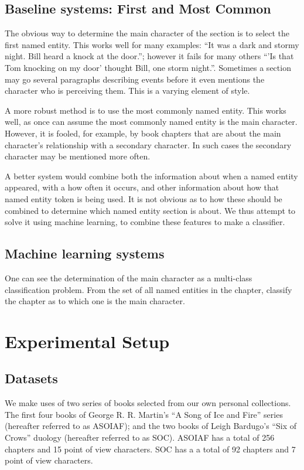 \documentclass[11pt,a4paper]{article}
\begin{document}
\subsection{Baseline systems: First and Most Common}
The obvious way to determine the main character of the section is to select the first named entity. This works well for many examples: ``It was a dark and stormy night. Bill heard a knock at the door.''; however it fails for many others ``'Is that Tom knocking on my door' thought Bill, one storm night.''.
Sometimes a section  may go several paragraphs describing events before it even mentions the character who is perceiving them.
This is a varying element of style.

A more robust method is to use the most commonly named entity.
This works well, as once can assume the most commonly named entity is the main character.
However, it is fooled, for example, by book chapters that are about the main character's relationship with a secondary character.
In such cases the secondary character may be mentioned more often.

A better system would combine both the information about when a named entity appeared,
with a how often it occurs, and other information about how that named entity token is being used.
It is not obvious as to how these should be combined to determine which named entity section is about.
We thus attempt to solve it using machine learning, to combine these features to make a classifier.

\subsection{Machine learning systems}
One can see the determination of the main character as a multi-class classification problem.
From the set of all named entities in the chapter, classify the chapter as to which one is the main character.







\section{Experimental Setup}\label{sec:experimental-setup}
\subsection{Datasets}
We make uses of two series of books selected from our own personal collections.
The first four books of George R. R. Martin's ``A Song of Ice and Fire'' series (hereafter referred to as ASOIAF);
and the two books of  Leigh Bardugo's ``Six of Crows'' duology (hereafter referred to as SOC).
ASOIAF has a total of 256 chapters and 15 point of view characters.
SOC has a a total of 92 chapters and 7  point of view characters.
\end{document}
